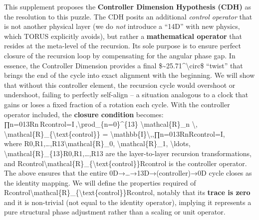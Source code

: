 \documentclass[
]{article}
\begin{document}
This supplement proposes the \textbf{Controller Dimension Hypothesis
(CDH)} as the resolution to this puzzle. The CDH posits an additional
\emph{control operator} that is not another physical layer (we do
\emph{not} introduce a ``14D'' with new physics, which TORUS explicitly
avoids\hspace{0pt}), but rather a \textbf{mathematical operator} that
resides at the meta-level of the recursion. Its sole purpose is to
ensure perfect closure of the recursion loop by compensating for the
angular phase gap. In essence, the Controller Dimension provides a final
\$\textasciitilde25.71\^{}\textbackslash circ\$ ``twist'' that brings
the end of the cycle into exact alignment with the beginning. We will
show that without this controller element, the recursion cycle would
overshoot or undershoot, failing to perfectly self-align -- a situation
analogous to a clock that gains or loses a fixed fraction of a rotation
each cycle. With the controller operator included, the \textbf{closure
condition} becomes:\\
∏n=013Rn Rcontrol=I ,\textbackslash prod\_\{n=0\}\^{}\{13\}
\textbackslash mathcal\{R\}\_n \textbackslash,
\textbackslash mathcal\{R\}\_\{\textbackslash text\{control\}\} =
\textbackslash mathbb\{I\}\textbackslash,,∏n=013\hspace{0pt}Rn\hspace{0pt}Rcontrol\hspace{0pt}=I,\\
where R0,R1,\ldots,R13\textbackslash mathcal\{R\}\_0,
\textbackslash mathcal\{R\}\_1, \textbackslash ldots,
\textbackslash mathcal\{R\}\_\{13\}R0\hspace{0pt},R1\hspace{0pt},\ldots,R13\hspace{0pt}
are the layer-to-layer recursion transformations, and
Rcontrol\textbackslash mathcal\{R\}\_\{\textbackslash text\{control\}\}Rcontrol\hspace{0pt}
is the controller operator. The above ensures that the entire
0D→\ldots→13D→(controller)→0D cycle closes as the identity mapping. We
will define the properties required of
Rcontrol\textbackslash mathcal\{R\}\_\{\textbackslash text\{control\}\}Rcontrol\hspace{0pt},
notably that its \textbf{trace is zero} and it is non-trivial (not equal
to the identity operator), implying it represents a pure structural
phase adjustment rather than a scaling or unit operator.
\end{document}

